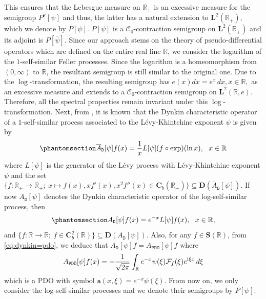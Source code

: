 \documentclass[12pt]{amsart}
\newcommand{\hlabel}{\phantomsection\label}
\numberwithin{equation}{section}
\newcommand{\bb}{\mathbb}
\newcommand{\cc}{\mathcal}
\newcommand{\ov}{\overline}
\newcommand{\ttt}{\mathtt}
\newcommand{\bmrm}[2][2]{\mathbf{#2}^{#1}}
\newcommand{\C}{\mathbf{C}}
\newcommand{\D}{\mathbf{D}}
\renewcommand{\SS}{\mathbf{S}}
\renewcommand{\tau}{\uptau}
\theoremstyle{definition}
\theoremstyle{assump}
\theoremstyle{remark}
\begin{document}
 This ensures that the Lebesgue measure on $\bb{R}_+$ is an excessive measure for the semigroup ${P}^\ttt{F}[\psi]$ and thus, the latter has a natural extension to $\bmrm{L}(\bb{R}_+)$, which we denote by ${P}[\psi]$. ${P}[\psi]$ is a $\cc{C}_0$-contraction semigroup on $\bmrm{L}(\bb{R}_+)$ and its adjoint is ${P}[\ov{\psi}]$. Since our  approach stems on the theory of  pseudo-differential operators which are defined on the entire real line $\bb{R}$, we consider   the logarithm of the $1$-self-similar Feller processes. Since the logarithm is  a homeomorphism from $(0,\infty)$ to $\bb{R}$, the resultant semigroup is still similar to the original one. Due to the $\log$-transformation, the resulting semigroup has $e(x)dx=e^x\,dx, x\in \bb{R},$ as an excessive measure and extends to a $\cc{C}_0$-contraction semigroup on $\bmrm{L}(\bb{R},e)$. Therefore, all the spectral properties remain invariant under this $\log$-transformation. Next, from \cite{Lamperti1972}, it is known that the Dynkin characteristic operator of a $1$-self-similar process associated to the L\'evy-Khintchine exponent $\psi$ is given by
\begin{align} \hlabel{eq:dynk}
\overline{A}_\ttt{D}[\psi]f(x)=\frac{1}{x}L[\psi](f\circ\exp)(\ln x), \ \ x\in\bb{R}
\end{align}
where $L[\psi]$ is the generator of the L\'evy process with L\'evy-Khintchine exponent $\psi$ and the set
$\{f:\bb{R}_+\to\bb{R}_+; \: x\mapsto f(x), xf'(x), x^2f''(x)\in \C_b(\bb{R}_+)\}\subseteq\D(\overline{A}_\ttt{D}[\psi])$.
If now $A_\ttt{D}[\psi]$ denotes the Dynkin characteristic operator of the log-self-similar process, then
\begin{align}\hlabel{eq:dynkin=pdo}
A_\ttt{D}[\psi]f(x)=e^{-x}L[\psi]f(x), \ \ x\in\bb{R},
\end{align}
and $
\{f:\bb{R}\to\bb{R}; \: f\in \C^2_b(\bb{R})\}\subseteq\D(A_\ttt{D}[\psi])$.
Also, for any $f\in\SS(\bb{R})$, from \eqref{eq:dynkin=pdo}, we deduce that $A_\ttt{D}[\psi]f= A_\ttt{PDO}[\psi]f$  where
\begin{align*}
A_\ttt{PDO}[\psi]f(x)=-\frac{1}{\sqrt{2\pi}}\int_\bb{R} e^{-x}\psi(\xi)\mathcal{F}_{f}(\xi)e^{{\rm{i}}\xi   x}\,d\xi
\end{align*}
which is a PDO with symbol $\ttt a(x,\xi)=e^{-x}\psi(\xi)$.
From now on, we only consider the log-self-similar processes and we denote their semigroups by $P[\psi]$. %
\end{document}
